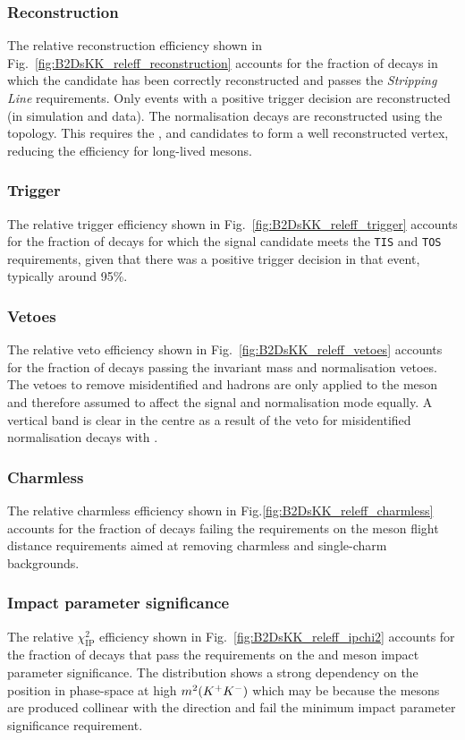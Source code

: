 \subsubsection{Reconstruction} 
The relative reconstruction efficiency shown in Fig.~\ref{fig:B2DsKK_releff_reconstruction} accounts for the fraction of decays in which the candidate has been correctly reconstructed and passes the \decay{\Bp}{\Dsp\Kp\Km} \emph{Stripping Line} requirements. Only events with a positive trigger decision are reconstructed (in simulation and data). The \decay{\Bp}{\Dsp\Dzb} normalisation decays are reconstructed using the \decay{\Bp}{\Dsp\Kp\Km} topology. This requires the \Dsp, \Kp and \Km candidates to form a well reconstructed vertex, reducing the efficiency for long-lived \Dzb mesons. 

\subsubsection{Trigger} 
The relative trigger efficiency shown in Fig.~\ref{fig:B2DsKK_releff_trigger} accounts for the fraction of decays for which the signal candidate meets the \texttt{TIS} and \texttt{TOS} requirements, given that there was a positive trigger decision in that event, typically around 95\%. 

\subsubsection{Vetoes} 
The relative veto efficiency shown in Fig.~\ref{fig:B2DsKK_releff_vetoes} accounts for the fraction of decays passing the invariant mass and normalisation vetoes. The vetoes to remove misidentified \D and \Lc hadrons are only applied to the \Dsp meson and therefore assumed to affect the signal and normalisation mode equally.
A vertical band is clear in the centre as a result of the veto for misidentified normalisation decays with \decay{\Dzb}{\Kp\pim}.

\subsubsection{Charmless} 
The relative charmless efficiency shown in Fig.\ref{fig:B2DsKK_releff_charmless} accounts for the fraction of decays failing the requirements on the \D meson flight distance requirements aimed at removing charmless and single-charm backgrounds.

\subsubsection{Impact parameter significance} 
The relative $\chi^{2}_{\text{IP}}$ efficiency shown in Fig.~\ref{fig:B2DsKK_releff_ipchi2} accounts for the fraction of decays that pass the requirements on the \Bp and \Dsp meson impact parameter significance. The distribution shows a strong dependency on the position in phase-space at high $m^{2}({{K}^+}{{K}^-})$ which may be because the \Dsp mesons are produced collinear with the \Bp direction and fail the minimum impact parameter significance requirement.

